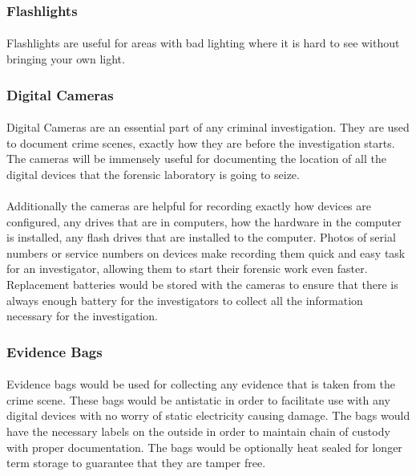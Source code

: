 \documentclass[12pt]{article}
\begin{document}
\subsubsection{Flashlights}
\paragraph{}
Flashlights are useful for areas with bad lighting where it is hard to see without bringing your own light. 
\subsubsection{Digital Cameras}
\paragraph{}
Digital Cameras are an essential part of any criminal investigation.
They are used to document crime scenes, exactly how they are before the investigation starts. 
The cameras will be immensely useful for documenting the location of all the digital devices that the forensic laboratory is going to seize. 
\cite[p.~129]{hayes}
\paragraph{}
Additionally the cameras are helpful for recording exactly how devices are configured, any drives that are in computers, how the hardware in the computer is installed, any flash drives that are installed to the computer.
Photos of serial numbers or service numbers on devices make recording them quick and easy task for an investigator, allowing them to start their forensic work even faster. 
Replacement batteries would be stored with the cameras to ensure that there is always enough battery for the investigators to collect all the information necessary for the investigation.
\cite[p.~129]{hayes}
\subsubsection{Evidence Bags}
\paragraph{}
Evidence bags would be used for collecting any evidence that is taken from the crime scene.
These bags would be antistatic in order to facilitate use with any digital devices with no worry of static electricity causing damage. 
The bags would have the necessary labels on the outside in order to maintain chain of custody with proper documentation. 
The bags would be optionally heat sealed for longer term storage to guarantee that they are tamper free. 
\cite[p.~130]{hayes}
\end{document}
